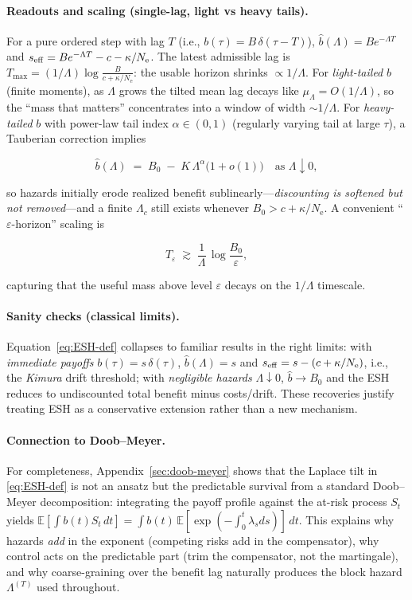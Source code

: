 \documentclass[11pt]{article}
\theoremstyle{upright}
\newcommand{\E}{\mathbb{E}}
\newcommand{\Ne}{N_{\mathrm{e}}}
\newcommand{\seff}[1][]{s_{\mathrm{eff}\if\relax\detokenize{#1}\relax\else,#1\fi}}
\newcommand{\hazT}[1]{\Lambda^{(#1)}}          %
\begin{document}
\paragraph{Readouts and scaling (single-lag, light vs heavy tails).}
For a pure ordered step with lag $T$ (i.e., $b(\tau)=B\,\delta(\tau-T)$), $\widehat b(\Lambda)=B e^{-\Lambda T}$ and $\seff=B e^{-\Lambda T}-c-\kappa/\Ne$. The latest admissible lag is $T_{\max}=(1/\Lambda)\log\!\frac{B}{c+\kappa/\Ne}$: the usable horizon shrinks $\propto 1/\Lambda$. For \emph{light-tailed}  $b$ (finite moments), as $\Lambda$ grows the tilted mean lag decays like $\mu_\Lambda=O(1/\Lambda)$, so the “mass that matters” concentrates into a window of width $\sim 1/\Lambda$. For \emph{heavy-tailed} $b$ with power-law tail index $\alpha\in(0,1)$ (regularly varying tail at large $\tau$), a Tauberian correction implies

$$
\widehat b(\Lambda)\;=\;B_0\;-\;K\,\Lambda^{\alpha}\big(1+o(1)\big)\quad\text{as }\Lambda\downarrow 0,
$$

so hazards initially erode realized benefit sublinearly—\emph{discounting is softened but not removed}—and a finite $\Lambda_c$ still exists whenever $B_0>c+\kappa/\Ne$. A convenient “$\varepsilon$-horizon” scaling is

$$
T_\varepsilon\;\gtrsim\;\frac{1}{\Lambda}\,\log\!\frac{B_0}{\varepsilon},
$$

capturing that the useful mass above level $\varepsilon$ decays on the $1/\Lambda$ timescale.

\paragraph{Sanity checks (classical limits).}
Equation~\eqref{eq:ESH-def} collapses to familiar results in the right limits: with \emph{immediate payoffs}  $b(\tau)=s\,\delta(\tau)$, $\widehat b(\Lambda)=s$ and $\seff=s-(c+\kappa/\Ne)$, i.e., the \emph{Kimura} drift threshold; with \emph{negligible hazards} $\Lambda\downarrow 0$, $\widehat b\to B_0$ and the ESH reduces to undiscounted total benefit minus costs/drift. These recoveries justify treating ESH as a conservative extension rather than a new mechanism.

\paragraph{Connection to Doob--Meyer.}
For completeness, Appendix~\ref{sec:doob-meyer} shows that the Laplace tilt in \eqref{eq:ESH-def} is not an ansatz but the predictable survival from a standard Doob--Meyer decomposition: integrating the payoff profile against the at-risk process $S_t$ yields $\E[\int b(t)S_t\,dt]=\int b(t)\,\E[\exp(-\int_0^t \lambda_s ds)]\,dt$. This explains why hazards \emph{add} in the exponent (competing risks add in the compensator), why control acts on the predictable part (trim the compensator, not the martingale), and why coarse-graining over the benefit lag naturally produces the block hazard $\hazT{T}$ used throughout.
\end{document}
